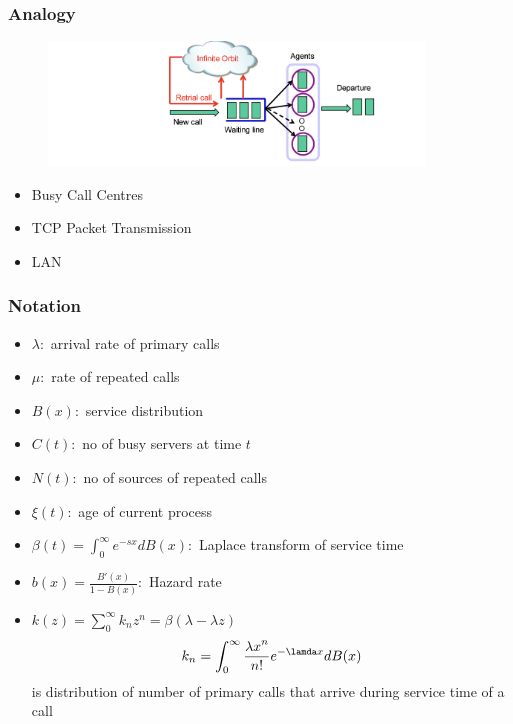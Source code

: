 \documentclass{beamer}
\def \mp {\pause}
\def \mp {}
\newcommand{\ft}[1]{\frametitle{#1}}
\begin{document}
\begin{frame}
 \ft{Analogy}
 \begin{figure}
\includegraphics[width=10cm]{retrial}
\centering
\end{figure}
\begin{itemize}\setlength\itemsep{.8em}
    \mp \item Busy Call Centres
    \mp \item TCP Packet Transmission
    \mp \item LAN
\end{itemize}
\end{frame}

\begin{frame}
  \ft{Notation}%
\begin{itemize}\setlength\itemsep{.6em}
  \mp \item $\lambda:$ arrival rate of primary calls
   \mp \item $\mu:$ rate of repeated calls
    \mp \item $B(x):$ service distribution
    \mp \item $C(t):$ no of busy servers at time $t$
    \mp \item $N(t):$ no of sources of repeated calls
    \mp \item $\xi(t):$ age of current process
    \mp \item $\beta(t)=\int_{0}^{\infty}e^{-sx}dB(x):$ Laplace transform of service time
    \mp \item $b(x)=\frac{B'(x)}{1-B(x)}:$ Hazard rate
    \mp \item $k(z)=\sum_{0}^{\infty}k_nz^n=\beta(\lambda-\lambda z)$
    $$k_n=\int_{0}^{\infty}\frac{{\lambda x}^n}{n!}e^{-\lamda x}dB(x)$$
    is distribution of number of primary calls that arrive during service time of a call
 \end{itemize}


\end{frame}
\end{document}
